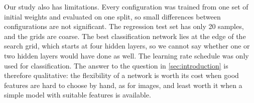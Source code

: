 Our study also has limitations. Every configuration was trained from one set of initial
weights and evaluated on one split, so small differences between configurations are not
significant. The regression test set has only 20 samples, and the grids are coarse. The best
classification network lies at the edge of the search grid, which starts at four hidden
layers, so we cannot say whether one or two hidden layers would have done as well. The learning rate schedule was only
used for classification. The answer to the question in \cref{sec:introduction} is therefore
qualitative: the flexibility of a network is worth its cost when good features are hard to
choose by hand, as for images, and least worth it when a simple model with suitable features
is available.
